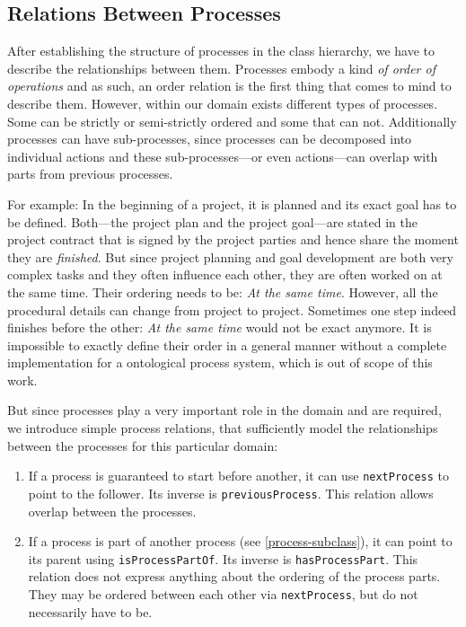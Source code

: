\documentclass[a4paper, DIV=13, BCOR=0cm]{scrbook}
\newcommand{\relation}[1]{\texttt{#1}}
\begin{document}
\subsection{Relations Between Processes}
After establishing the structure of processes in the class hierarchy, we have to describe the relationships between them. Processes embody a kind \textit{of order of operations} and as such, an order relation is the first thing that comes to mind to describe them. However, within our domain exists different types of processes. Some can be strictly or semi-strictly ordered and some that can not. Additionally processes can have sub-processes, since processes can be decomposed into individual actions and these sub-processes---or even actions---can overlap with parts from previous processes.

For example: In the beginning of a project, it is planned and its exact goal has to be defined. Both---the project plan and the project goal---are stated in the project contract that is signed by the project parties and hence share the moment they are \textit{finished}. But since project planning and goal development are both very complex tasks and they often influence each other, they are often worked on at the same time. Their ordering needs to be: \textit{At the same time}. However, all the procedural details can change from project to project. Sometimes one step indeed finishes before the other: \textit{At the same time} would not be exact anymore. It is impossible to exactly define their order in a general manner without a complete implementation for a ontological process system, which is out of scope of this work.

But since processes play a very important role in the domain and are required, we introduce simple process relations, that sufficiently model the relationships between the processes for this particular domain:
\begin{enumerate}
	\item If a process is guaranteed to start before another, it can use \relation{nextProcess} to point to the follower. Its inverse is \relation{previousProcess}. This relation allows overlap between the processes.
	\item If a process is part of another process (see \autoref{process-subclass}), it can point to its parent using \relation{isProcessPartOf}. Its inverse is \relation{hasProcessPart}. This relation does not express anything about the ordering of the process parts. They may be ordered between each other via \relation{nextProcess}, but do not necessarily have to be.
\end{enumerate}
\end{document}
